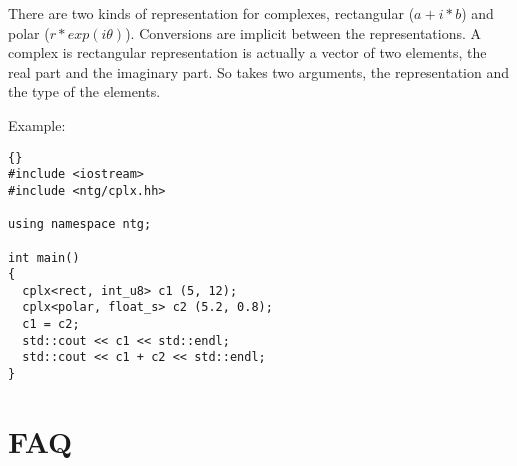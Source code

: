 There are two kinds of representation for complexes, rectangular ($a +
i * b$) and polar ($r * exp(i\theta)$).  Conversions are implicit
between the representations.  A complex is rectangular representation
is actually a vector of two elements, the real part and the imaginary
part.  So  takes two arguments, the representation and the
type of the elements.

Example:

\begin{lstlisting}{}
#include <iostream>
#include <ntg/cplx.hh>

using namespace ntg;

int main()
{
  cplx<rect, int_u8> c1 (5, 12);
  cplx<polar, float_s> c2 (5.2, 0.8);
  c1 = c2;
  std::cout << c1 << std::endl;
  std::cout << c1 + c2 << std::endl;
}
\end{lstlisting}


\section{FAQ}

